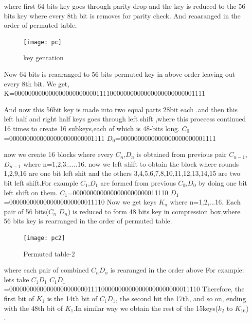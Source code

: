 \documentclass[11pt]{article}
\begin{document}
where first 64 bits key goes through parity drop and the key is reduced to the 56 bits key where every 8th bit is removes for parity check.\newline
And reaaranged in the order of permuted table.\newpage
\begin{figure}[!h]
	\begin{center}
		\texttt{[image: pc]}
	\end{center}
	\caption{key genration}\label{nice_figure6}
\end{figure}
Now 64 bits is reaaranged to 56 bits permuted key in above order leaving out every 8th bit.
We get,\newline
K=00000000000000000000000011110000000000000000000000001111
 
And now this 56bit key is made into two equal parts 28bit each .and then this left half and right half keys goes through left shift ,where this proccess continued 16 times to create 16 subkeys,each of which is 48-bits long.
\newline
\newline
$C_{0}$=0000000000000000000000001111\newline
$D_{0}$=0000000000000000000000001111
\newline

now we create 16 blocks where every $C_{n}$,$D_{n}$ is obtained from previous pair $C_{n-1}$,$D_{n-1}$ where n=1,2,3......16. now we left shift to obtain the block
where rounds 1,2,9,16 are one bit left shit and the others 3,4,5,6,7,8,10,11,12,13,14,15 are two bit left shift.For example  $C_{1}$,$D_{1}$ are formed from previous $C_{0}$,$D_{0}$ by doing one bit left shift on them.
\newline \newline
$C_{1}$=0000000000000000000000011110
\newline
$D_{1}$=0000000000000000000000011110
Now we get keys $K_{n}$ where n=1,2,...16. Each pair of 56 bits($C_{n}$ $D_{n}$) is reduced to form 48 bits key in compression box,where 56 bits key is rearranged in the order of permuted table.
\newpage
\begin{figure}[!h]
	\begin{center}
		\texttt{[image: pc2]}
	\end{center}
	\caption{Permuted table-2}\label{nice_figure6}
\end{figure}
where each pair of combined $C_{n}$$D_{n}$ is rearanged in the order above \newline
For example: lets take $C_{1}$$D_{1}$\newline
$C_{1}$$D_{1}$=00000000000000000000000111100000000000000000000000011110\newline
Therefore, the first bit of $K_{1}$ is the 14th bit of $C_{1}$$D_{1}$, the second bit the 17th, and so on, ending with the 48th bit of $K_{1}$.In similar way we obtain the rest of the 15keys($k_{2}$ to $K_{16}$) .
\end{document}
